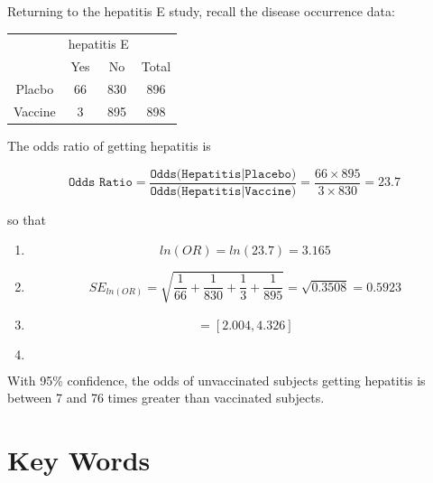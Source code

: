 \documentclass[11pt, chapterprefix=true]{scrbook}\usepackage[]{graphicx}\usepackage[]{color}
\begin{document}
Returning to the hepatitis E study, recall the disease occurrence data:

\begin{table}[ht]
\centering
\begin{tabular}{@{} cccc @{}} \hline
 & \multicolumn{2}{c}{hepatitis E} \\
 & Yes & No & Total \\ \hline
 Placbo  & 66 & 830 & 896 \\
 Vaccine & 3 & 895 & 898 \\
  \hline
 \end{tabular}
 \end{table}

The odds ratio of getting hepatitis is

\begin{equation*}
  \texttt{Odds Ratio} = \frac{\texttt{Odds(Hepatitis|Placebo)}}{\texttt{Odds(Hepatitis|Vaccine)}} = \frac{66 \times 895}{3 \times 830} = 23.7
\end{equation*}

so that

\begin{enumerate}
\item
\begin{equation*}
  ln(OR) = ln(23.7) = 3.165
\end{equation*}

\item
\begin{equation*}
  SE_{ln(OR)} = \sqrt{ \frac{1}{66} + \frac{1}{830} + \frac{1}{3} + \frac{1}{895}   } = \sqrt{0.3508} = 0.5923
\end{equation*}

\item
\begin{equation*}
 [3.165-1.96 (0.5923), 3.165+1.96 (.5923)] = [2.004, 4.326]
\end{equation*}

\item
\begin{equation*}
  [ e^{2.004}, e^{4.326} ]
\end{equation*}
\end{enumerate}

With 95\% confidence, the odds of unvaccinated subjects getting hepatitis is between 7 and 76 times greater than vaccinated subjects.

\section{Key Words}
\end{document}
